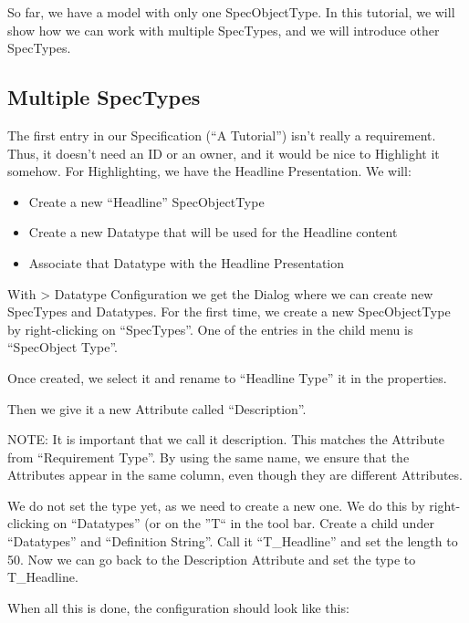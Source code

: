 So far, we have a model with only one SpecObjectType.  In this tutorial, we will show how we can work with multiple SpecTypes, and we will introduce other SpecTypes.

\subsection{Multiple SpecTypes}

The first entry in our Specification (``A \pror{} Tutorial'') isn't really a requirement.  Thus, it doesn't need an ID or an owner, and it would be nice to Highlight it somehow.  For Highlighting, we have the Headline Presentation.  We will:

\begin{itemize}

\item
  Create a new ``Headline'' SpecObjectType
\item
  Create a new Datatype that will be used for the Headline content
\item
  Associate that Datatype with the Headline Presentation
\end{itemize}

With \pror{} \textgreater{} Datatype Configuration we get the Dialog where we can create new SpecTypes and Datatypes.  For the first time, we create a new SpecObjectType by right-clicking on ``SpecTypes''.  One of the entries in the child menu is ``SpecObject Type''.

Once created, we select it and rename to ``Headline Type'' it in the properties.

Then we give it a new Attribute called ``Description''.

NOTE: It is important that we call it description.  This matches the Attribute from ``Requirement Type''.  By using the same name, we ensure that the Attributes appear in the same column, even though they are different Attributes.

We do not set the type yet, as we need to create a new one.  We do this by right-clicking on ``Datatypes'' (or on the ''T`` in the tool bar.  Create a child under ``Datatypes'' and  ``Definition String''.  Call it ``T\_Headline'' and set the length to 50.  Now we can go back to the Description Attribute and set the type to T\_Headline.

When all this is done, the configuration should look like this:

